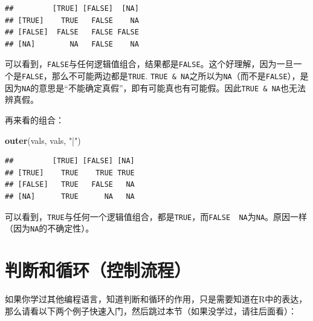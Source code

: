 \documentclass[]{book}
\newenvironment{Shaded}{\begin{snugshade}}{\end{snugshade}}
\newcommand{\CommentTok}[1]{\textcolor[rgb]{0.56,0.35,0.01}{\textit{#1}}}
\newcommand{\ControlFlowTok}[1]{\textcolor[rgb]{0.13,0.29,0.53}{\textbf{#1}}}
\newcommand{\DecValTok}[1]{\textcolor[rgb]{0.00,0.00,0.81}{#1}}
\newcommand{\KeywordTok}[1]{\textcolor[rgb]{0.13,0.29,0.53}{\textbf{#1}}}
\newcommand{\NormalTok}[1]{#1}
\newcommand{\OperatorTok}[1]{\textcolor[rgb]{0.81,0.36,0.00}{\textbf{#1}}}
\newcommand{\StringTok}[1]{\textcolor[rgb]{0.31,0.60,0.02}{#1}}
\begin{document}
\begin{verbatim}
##         [TRUE] [FALSE]  [NA]
## [TRUE]    TRUE   FALSE    NA
## [FALSE]  FALSE   FALSE FALSE
## [NA]        NA   FALSE    NA
\end{verbatim}

可以看到，\texttt{FALSE}与任何逻辑值组合，结果都是\texttt{FALSE}。这个好理解，因为一旦一个是\texttt{FALSE}，那么不可能两边都是\texttt{TRUE}. \texttt{TRUE\ \&\ NA}之所以为\texttt{NA}（而不是\texttt{FALSE}），是因为\texttt{NA}的意思是``不能确定真假''，即有可能真也有可能假。因此\texttt{TRUE\ \&\ NA}也无法辨真假。

再来看\texttt{\textbar{}}的组合：

\begin{Shaded}
\begin{Highlighting}[]
\KeywordTok{outer}\NormalTok{(vals, vals, }\StringTok{"|"}\NormalTok{)}
\end{Highlighting}
\end{Shaded}

\begin{verbatim}
##         [TRUE] [FALSE] [NA]
## [TRUE]    TRUE    TRUE TRUE
## [FALSE]   TRUE   FALSE   NA
## [NA]      TRUE      NA   NA
\end{verbatim}

可以看到，\texttt{TRUE}与任何一个逻辑值组合，都是\texttt{TRUE}，而\texttt{FALSE\ \textbar{}\ NA}为\texttt{NA}。原因一样（因为\texttt{NA}的不确定性）。

\section{判断和循环（控制流程）}

如果你学过其他编程语言，知道判断和循环的作用，只是需要知道在R中的表达，那么请看以下两个例子快速入门，然后跳过本节（如果没学过，请往后面看）：

\begin{Shaded}
\end{Shaded}
\end{document}
